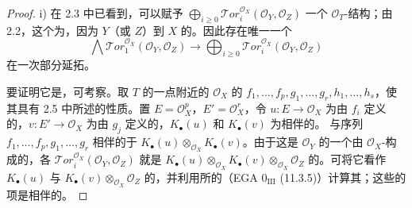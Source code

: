 \begin{proof}
 i) 在 2.3 中已看到，可以赋予 $\bigoplus_{i\geq0}\mathcal{T}or_i^{\mathcal O_X}(\mathcal O_Y,\mathcal O_Z)$ 一个 $\mathcal O_T$-结构；由 2.2，这个为，因为 $Y$（或 $Z$）到 $X$ 的。因此存在唯一一个
\[
\bigwedge\mathcal{T}or_1^{\mathcal O_X}(\mathcal O_Y,\mathcal O_Z)
\longrightarrow\bigoplus_{i\geq0}\mathcal{T}or_i^{\mathcal O_X}(\mathcal O_Y,\mathcal O_Z)\tag{2.5.1}
\]
在一次部分延拓。

要证明它是，可考察。取 $T$ 的一点附近的 $\mathcal O_X$ 的 $f_1,\ldots,f_p,g_1,\ldots,g_r,h_1,\ldots,h_s$，使其具有 2.5 中所述的性质。置 $E=\mathcal O_X^p$，$E'=\mathcal O_X^r$，令 $u:E\to\mathcal O_X$ 为由 $f_i$ 定义的，$v:E'\to\mathcal O_X$ 为由 $g_j$ 定义的，$K_\bullet(u)$ 和 $K_\bullet(v)$ 为相伴的。
与序列 $f_1,\ldots,f_p,g_1,\ldots,g_r$ 相伴的于 $K_\bullet(u)\otimes_{\mathcal O_X}K_\bullet(v)$。由于这是 $\mathcal O_Y$ 的一个由 $\mathcal O_X$-构成的，各 $\mathcal{T}or_i^{\mathcal O_X}(\mathcal O_Y,\mathcal O_Z)$ 就是 $K_\bullet(u)\otimes_{\mathcal O_X}K_\bullet(v)\otimes_{\mathcal O_X}\mathcal O_Z$ 的。可将它看作 $K_\bullet(u)$ 与 $K_\bullet(v)\otimes_{\mathcal O_X}\mathcal O_Z$ 的，并利用所的（EGA $0_{\mathrm{III}}$ (11.3.5)）计算其；这些的项是相伴的。


\end{proof}
